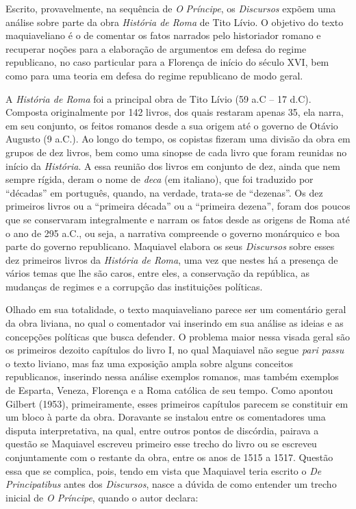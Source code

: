 Escrito, provavelmente, na sequência de \emph{O} \emph{Príncipe}, os
\emph{Discursos} expõem uma análise sobre parte da obra \emph{História
de Roma} de Tito Lívio. O objetivo do texto maquiaveliano é o de
comentar os fatos narrados pelo historiador romano e recuperar noções
para a elaboração de argumentos em defesa do regime republicano, no caso
particular para a Florença de início do século XVI, bem como para uma
teoria em defesa do regime republicano de modo geral.

A \emph{História de Roma} foi a principal obra de Tito Lívio (59 a.C --
17 d.C). Composta originalmente por 142 livros, dos quais restaram
apenas 35, ela narra, em seu conjunto, os feitos romanos desde a sua
origem até o governo de Otávio Augusto (9 a.C.). Ao longo do tempo, os
copistas fizeram uma divisão da obra em grupos de dez livros, bem como
uma sinopse de cada livro que foram reunidas no início da
\emph{História}. A essa reunião dos livros em conjunto de dez, ainda que
nem sempre rígida, deram o nome de \emph{deca} (em italiano), que foi
traduzido por ``décadas'' em português, quando, na verdade, trata-se de
``dezenas''. Os dez primeiros livros ou a ``primeira década'' ou a
``primeira dezena'', foram dos poucos que se conservaram
integralmente e narram os fatos desde as origens de Roma até o ano de
295 a.C., ou seja, a narrativa compreende o governo monárquico e boa
parte do governo republicano. Maquiavel elabora os seus \emph{Discursos}
sobre esses dez primeiros livros da \emph{História de Roma}, uma vez que
nestes há a presença de vários temas que lhe são caros, entre eles, a
conservação da república, as mudanças de regimes e a corrupção das
instituições políticas.

Olhado em sua totalidade, o texto maquiaveliano parece ser um comentário
geral da obra liviana, no qual o comentador vai inserindo em sua análise
as ideias e as concepções políticas que busca defender. O problema maior
nessa visada geral são os primeiros dezoito capítulos do livro I, no
qual Maquiavel não segue
\emph{pari passu} o
texto liviano, mas faz uma exposição ampla sobre alguns conceitos
republicanos, inserindo nessa análise exemplos romanos, mas também
exemplos de Esparta, Veneza, Florença e a Roma católica de seu tempo.
Como apontou Gilbert (1953), primeiramente, esses primeiros capítulos
parecem se constituir em um bloco à parte da obra. Doravante se instalou
entre os comentadores uma disputa interpretativa, na qual, entre outros
pontos de discórdia, pairava a questão se Maquiavel escreveu primeiro
esse trecho do livro ou se escreveu conjuntamente com o restante da
obra, entre os anos de 1515 a 1517. Questão essa que se complica, pois,
tendo em vista que Maquiavel teria escrito o \emph{De Principatibus}
antes dos \emph{Discursos}, nasce a dúvida de como entender um trecho
inicial de \emph{O Príncipe}, quando o autor declara:

